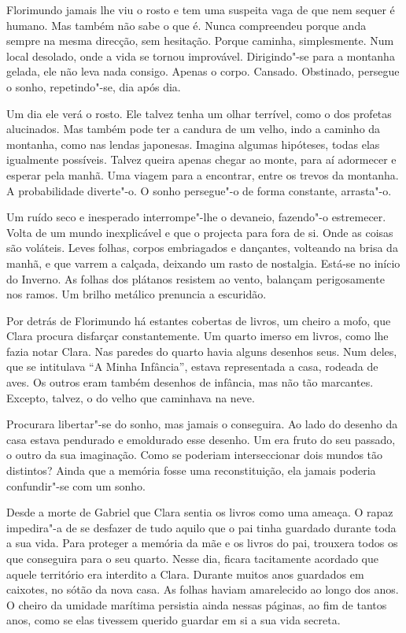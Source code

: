 Florimundo jamais lhe viu o rosto e tem uma suspeita vaga de que nem
sequer é humano. Mas também não sabe o que é. Nunca compreendeu porque
anda sempre na mesma direcção, sem hesitação. Porque caminha,
simplesmente. Num local desolado, onde a vida se tornou improvável.
Dirigindo"-se para a montanha gelada, ele não leva nada consigo. Apenas o
corpo. Cansado. Obstinado, persegue o sonho, repetindo"-se, dia após dia.

Um dia ele verá o rosto. Ele talvez tenha um olhar terrível, como o dos
profetas alucinados. Mas também pode ter a candura de um velho, indo a
caminho da montanha, como nas lendas japonesas. Imagina algumas
hipóteses, todas elas igualmente possíveis. Talvez queira apenas chegar
ao monte, para aí adormecer e esperar pela manhã. Uma viagem para a
encontrar, entre os trevos da montanha. A probabilidade diverte"-o. O
sonho persegue"-o de forma constante, arrasta"-o.

Um ruído seco e inesperado interrompe"-lhe o devaneio, fazendo"-o
estremecer. Volta de um mundo inexplicável e que o projecta para fora de
si. Onde as coisas são voláteis. Leves folhas, corpos embriagados e
dançantes, volteando na brisa da manhã, e que varrem a calçada, deixando
um rasto de nostalgia. Está-se no início do Inverno. As folhas dos
plátanos resistem ao vento, balançam perigosamente nos ramos. Um brilho
metálico prenuncia a escuridão.

Por detrás de Florimundo há estantes cobertas de livros, um cheiro a
mofo, que Clara procura disfarçar constantemente. Um quarto imerso em
livros, como lhe fazia notar Clara. Nas paredes do quarto havia alguns
desenhos seus. Num deles, que se intitulava ``A Minha Infância'', estava
representada a casa, rodeada de aves. Os outros eram também desenhos de
infância, mas não tão marcantes. Excepto, talvez, o do velho que
caminhava na neve.

Procurara libertar"-se do sonho, mas jamais o conseguira. Ao lado do
desenho da casa estava pendurado e emoldurado esse desenho. Um era fruto
do seu passado, o outro da sua imaginação. Como se poderiam
interseccionar dois mundos tão distintos? Ainda que a memória fosse uma
reconstituição, ela jamais poderia confundir"-se com um sonho.

Desde a morte de Gabriel que Clara sentia os livros como uma ameaça. O
rapaz impedira"-a de se desfazer de tudo aquilo que o pai tinha guardado
durante toda a sua vida. Para proteger a memória da mãe e os livros do
pai, trouxera todos os que conseguira para o seu quarto. Nesse dia,
ficara tacitamente acordado que aquele território era interdito a Clara.
Durante muitos anos guardados em caixotes, no sótão da nova casa. As
folhas haviam amarelecido ao longo dos anos. O cheiro da umidade
marítima persistia ainda nessas páginas, ao fim de tantos anos, como se
elas tivessem querido guardar em si a sua vida secreta.

